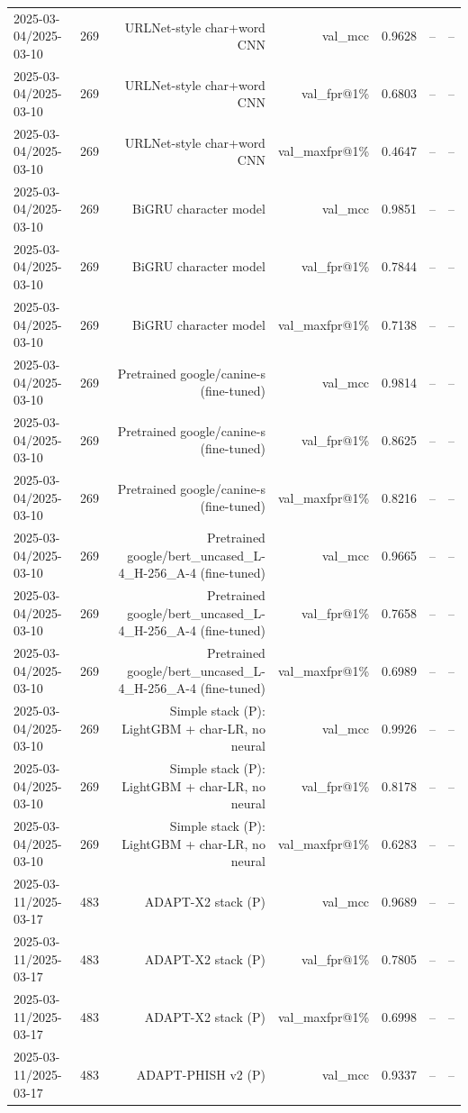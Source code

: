 \begin{table}[t]
\begin{tabular}{llrrrrr}
2025-03-04/2025-03-10 & 269 & URLNet-style char+word CNN & val\_mcc & 0.9628 & -- & -- \\
2025-03-04/2025-03-10 & 269 & URLNet-style char+word CNN & val\_fpr@1\% & 0.6803 & -- & -- \\
2025-03-04/2025-03-10 & 269 & URLNet-style char+word CNN & val\_maxfpr@1\% & 0.4647 & -- & -- \\
2025-03-04/2025-03-10 & 269 & BiGRU character model & val\_mcc & 0.9851 & -- & -- \\
2025-03-04/2025-03-10 & 269 & BiGRU character model & val\_fpr@1\% & 0.7844 & -- & -- \\
2025-03-04/2025-03-10 & 269 & BiGRU character model & val\_maxfpr@1\% & 0.7138 & -- & -- \\
2025-03-04/2025-03-10 & 269 & Pretrained google/canine-s (fine-tuned) & val\_mcc & 0.9814 & -- & -- \\
2025-03-04/2025-03-10 & 269 & Pretrained google/canine-s (fine-tuned) & val\_fpr@1\% & 0.8625 & -- & -- \\
2025-03-04/2025-03-10 & 269 & Pretrained google/canine-s (fine-tuned) & val\_maxfpr@1\% & 0.8216 & -- & -- \\
2025-03-04/2025-03-10 & 269 & Pretrained google/bert\_uncased\_L-4\_H-256\_A-4 (fine-tuned) & val\_mcc & 0.9665 & -- & -- \\
2025-03-04/2025-03-10 & 269 & Pretrained google/bert\_uncased\_L-4\_H-256\_A-4 (fine-tuned) & val\_fpr@1\% & 0.7658 & -- & -- \\
2025-03-04/2025-03-10 & 269 & Pretrained google/bert\_uncased\_L-4\_H-256\_A-4 (fine-tuned) & val\_maxfpr@1\% & 0.6989 & -- & -- \\
2025-03-04/2025-03-10 & 269 & Simple stack (P): LightGBM + char-LR, no neural & val\_mcc & 0.9926 & -- & -- \\
2025-03-04/2025-03-10 & 269 & Simple stack (P): LightGBM + char-LR, no neural & val\_fpr@1\% & 0.8178 & -- & -- \\
2025-03-04/2025-03-10 & 269 & Simple stack (P): LightGBM + char-LR, no neural & val\_maxfpr@1\% & 0.6283 & -- & -- \\
2025-03-11/2025-03-17 & 483 & ADAPT-X2 stack (P) & val\_mcc & 0.9689 & -- & -- \\
2025-03-11/2025-03-17 & 483 & ADAPT-X2 stack (P) & val\_fpr@1\% & 0.7805 & -- & -- \\
2025-03-11/2025-03-17 & 483 & ADAPT-X2 stack (P) & val\_maxfpr@1\% & 0.6998 & -- & -- \\
2025-03-11/2025-03-17 & 483 & ADAPT-PHISH v2 (P) & val\_mcc & 0.9337 & -- & -- \\

\end{tabular}
\end{table}
